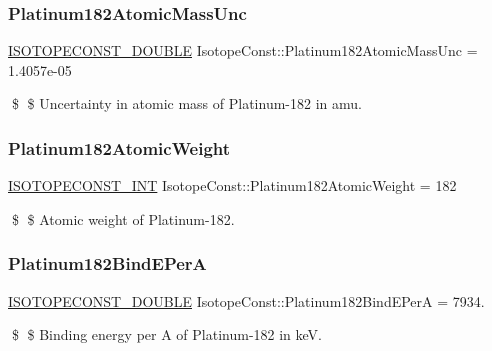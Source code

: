 \subsubsection{\texorpdfstring{Platinum182\+Atomic\+Mass\+Unc}{Platinum182AtomicMassUnc}}
{\footnotesize\ttfamily \mbox{\hyperlink{group___isotope_const-_macros_ga8f45a7272ce02c0b4c65c44636ed719a}{I\+S\+O\+T\+O\+P\+E\+C\+O\+N\+S\+T\+\_\+\+D\+O\+U\+B\+LE}} Isotope\+Const\+::\+Platinum182\+Atomic\+Mass\+Unc = 1.\+4057e-\/05}

\$ \$ Uncertainty in atomic mass of Platinum-\/182 in amu. \mbox{\label{group___isotope_const-_platinum-_pt182_ga3c77eef263e6f941e914ed51ab9d9b35}} 
\subsubsection{\texorpdfstring{Platinum182\+Atomic\+Weight}{Platinum182AtomicWeight}}
{\footnotesize\ttfamily \mbox{\hyperlink{group___isotope_const-_macros_ga5f18360b3e99483a35c32d789e62621c}{I\+S\+O\+T\+O\+P\+E\+C\+O\+N\+S\+T\+\_\+\+I\+NT}} Isotope\+Const\+::\+Platinum182\+Atomic\+Weight = 182}

\$ \$ Atomic weight of Platinum-\/182. \mbox{\label{group___isotope_const-_platinum-_pt182_gad8df44c1eecac2641069e079f10b7d66}} 
\subsubsection{\texorpdfstring{Platinum182\+Bind\+E\+PerA}{Platinum182BindEPerA}}
{\footnotesize\ttfamily \mbox{\hyperlink{group___isotope_const-_macros_ga8f45a7272ce02c0b4c65c44636ed719a}{I\+S\+O\+T\+O\+P\+E\+C\+O\+N\+S\+T\+\_\+\+D\+O\+U\+B\+LE}} Isotope\+Const\+::\+Platinum182\+Bind\+E\+PerA = 7934.}

\$ \$ Binding energy per A of Platinum-\/182 in keV. \mbox{\label{group___isotope_const-_platinum-_pt182_gad99a15f912b333460c794efc474d6b6b}} 
